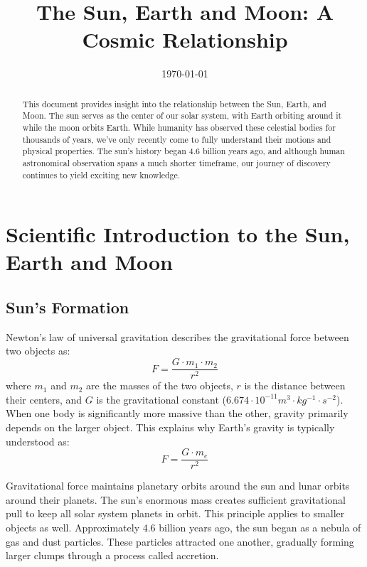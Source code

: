 \documentclass[12pt,oneside,a4paper,english]{article}
\author{}
\title{\textbf{The Sun, Earth and Moon: A Cosmic Relationship}}
\date{\today}
\begin{document}
\maketitle

\begin{abstract}
    This document provides insight into the relationship between the Sun, Earth, and Moon. The sun serves as the center of our solar system, with Earth orbiting around it while the moon orbits Earth. While humanity has observed these celestial bodies for thousands of years, we've only recently come to fully understand their motions and physical properties. The sun's history began 4.6 billion years ago, and although human astronomical observation spans a much shorter timeframe, our journey of discovery continues to yield exciting new knowledge.
\end{abstract}

\section{Scientific Introduction to the Sun, Earth and Moon}
\subsection{Sun's Formation}
Newton's law of universal gravitation describes the gravitational force between two objects as:
\begin{equation}
    F = \frac{G \cdot m_1 \cdot m_2}{r^2}
\end{equation}
where $m_1$ and $m_2$ are the masses of the two objects, $r$ is the distance between their centers, and $G$ is the gravitational constant ($6.674\cdot 10^{-11} m^3 \cdot kg^{-1} \cdot s^{-2}$). When one body is significantly more massive than the other, gravity primarily depends on the larger object. This explains why Earth's gravity is typically understood as:
\begin{equation}
    F = \frac{G \cdot m_e}{r^2}
\end{equation}

Gravitational force maintains planetary orbits around the sun and lunar orbits around their planets. The sun's enormous mass creates sufficient gravitational pull to keep all solar system planets in orbit. This principle applies to smaller objects as well. Approximately 4.6 billion years ago, the sun began as a nebula of gas and dust particles. These particles attracted one another, gradually forming larger clumps through a process called accretion.
\end{document}
